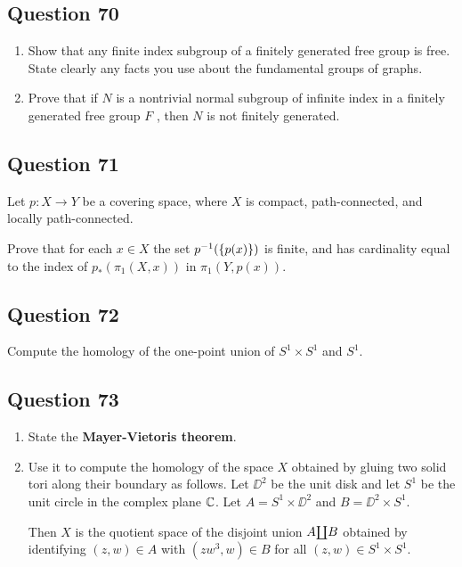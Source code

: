 \documentclass[12pt]{article}
\begin{document}
\hypertarget{question-70-3}{%
\subsection{Question 70}\label{question-70-3}}

\begin{enumerate}
\def\labelenumi{\alph{enumi}.}
\item
  Show that any finite index subgroup of a finitely generated free group
  is free. State clearly any facts you use about the fundamental groups
  of graphs.
\item
  Prove that if \(N\) is a nontrivial normal subgroup of infinite index
  in a finitely generated free group \(F\) , then \(N\) is not finitely
  generated.
\end{enumerate}

\hypertarget{question-71-3}{%
\subsection{Question 71}\label{question-71-3}}

Let \(p : X \to Y\) be a covering space, where \(X\) is compact,
path-connected, and locally path-connected.

Prove that for each \(x \in X\) the set \(p^{-1} (\left\{{p(x)}\right\})\) is
finite, and has cardinality equal to the index of \(p_* (\pi_1 (X, x))\)
in \(\pi_1 (Y, p(x))\).

\hypertarget{question-72-3}{%
\subsection{Question 72}\label{question-72-3}}

Compute the homology of the one-point union of \(S^1 \times S^1\) and
\(S^1\).

\hypertarget{question-73-3}{%
\subsection{Question 73}\label{question-73-3}}

\begin{enumerate}
\def\labelenumi{\alph{enumi}.}
\item
  State the \textbf{Mayer-Vietoris theorem}.
\item
  Use it to compute the homology of the space \(X\) obtained by gluing
  two solid tori along their boundary as follows. Let \(\DD^2\) be the
  unit disk and let \(S^1\) be the unit circle in the complex plane
  \({\mathbb{C}}\). Let \(A = S^1 \times \DD^2\) and \(B = \DD^2 \times S^1\).

  Then \(X\) is the quotient space of the disjoint union
  \(A {\coprod} B\) obtained by identifying \((z, w) \in A\) with
  \((zw^3 , w) \in B\) for all \((z, w) \in S^1 \times S^1\).
\end{enumerate}
\end{document}
